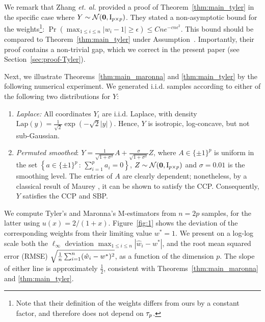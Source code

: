 \documentclass[times,sort&compress,3p]{elsarticle}
\newcommand{\Revision}[1]{{#1}}
\begin{document}
\Revision{We remark that Zhang {\it et. al.} \cite{zhang2016marvcenko} provided a proof of Theorem~\ref{thm:main_tyler} in the specific case where $Y \sim \mathcal{N}(\bm{0},\mathrm{I}_{p \times p})$.  They 
stated a non-asymptotic bound for the 
weights\footnote{Note that their definition of the weights differs from ours by a constant factor, and therefore does not depend on $\tau_p$.}: 
$
 \Pr\left(\max_{1\leq i \leq n}\left|w_i -1\right| \geq \epsilon \right) \leq Cne^{-cn\epsilon^2}
 $.
This bound should be compared to Theorem~\ref{thm:main_tyler} under Assumption~\AssumIndep. Importantly, their proof contains a non-trivial gap, which we correct in the present paper (see Section~\ref{sec:proof-Tyler}). }
\newline

Next,
we illustrate  Theorems~\ref{thm:main_maronna} and \ref{thm:main_tyler} by the following numerical experiment. We generated i.i.d. samples according to 
either of the following 
two distributions for $Y$:  
\begin{enumerate}
    \item {\it Laplace:} All coordinates $Y_i$ are i.i.d. Laplace, with density  $\mathrm{Lap}(y)= {\frac{1}{\sqrt{2}}}\exp(-\sqrt{2}|y|)$. Hence, $Y$ is isotropic, log-concave, but not sub-Gaussian. 
    \item {\it Permuted smoothed}: $Y = \frac{1}{\sqrt{1+\sigma^2}} A + \frac{\sigma}{\sqrt{1+\sigma^2}} Z$, where $A \in \{\pm 1\}^p$ is uniform in the set $\left\{a\in \{\pm 1\}^p \,:\,\sum_{i=1}^p a_i=0\right\}$, $Z\sim \mathcal{N}(\bm{0},\mathrm{I}_{p \times p})$ and $\sigma=0.01$ is the smoothing level. The entries of $A$ are clearly dependent; nonetheless, by a classical result of Maurey \cite{maurey1979construction}, it can be shown to satisfy the CCP. Consequently, $Y$ satisfies the CCP and SBP.
\end{enumerate}
\vspace{1em}


We compute Tyler's and Maronna's M-estimators from $n=2p$ samples, for the latter using $u(x)=2/(1+x)$. Figure~\ref{fig:1} shows the deviation of the corresponding weights from their limiting value %
$w^*=1$.  
We present on a log-log scale both the $\ell_\infty$ deviation $\max_{1\le i \le n}|\hat{w}_i-w^*|$, and the root mean squared error (RMSE) ${\small \sqrt{\frac1n \sum_{i=1}^n (\hat{w}_i-w^*)^2}}$, as a function of the dimension $p$. The slope of either line is approximately $\frac12$, consistent with  Theorems~\ref{thm:main_maronna} and \ref{thm:main_tyler}. 
\end{document}
